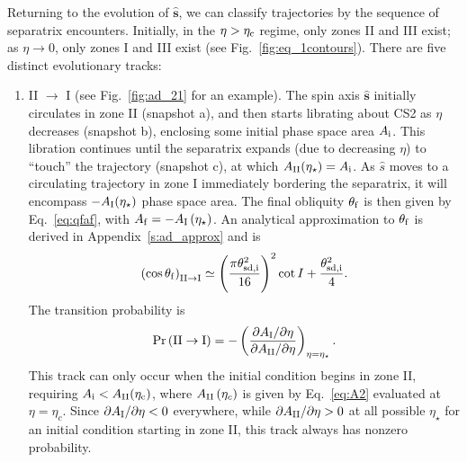 \documentclass[
        fleqn,
        usenatbib,
    ]{mnras}
\newcommand*{\pdil}[2]{\partial#1 / \partial#2}
\newcommand*{\bm}[1]{\boldsymbol{\mathbf{#1}}}
\newcommand*{\uv}[1]{\hat{\bm{#1}}}
\newcommand*{\p}[1]{\left(#1\right)}
\begin{document}
Returning to the evolution of $\uv{s}$, we can classify trajectories by the
sequence of separatrix encounters. Initially, in the $\eta > \eta_{\rm c}$
regime, only zones II and III exist; as $\eta \to 0$, only zones I and III exist
(see Fig.~\ref{fig:eq_1contours}). There are five distinct evolutionary tracks:
\begin{enumerate}
    \item II $\to$ I (see Fig.~\ref{fig:ad_21} for an example). The spin axis
        $\uv{s}$ initially circulates in zone II (snapshot a), and then starts
        librating about CS2 as $\eta$ decreases (snapshot b), enclosing some
        initial phase space area $A_{\rm i}$. This libration continues until the
        separatrix expands (due to decreasing $\eta$) to ``touch'' the
        trajectory (snapshot c), at which $A_{\rm II}(\eta_\star) = A_{\rm i}$.
        As $\hat{s}$ moves to a circulating trajectory in zone I immediately
        bordering the separatrix, it will encompass $-A_{\rm I}(\eta_\star)$
        phase space area. The final obliquity $\theta_{\rm f}$ is then given by
        Eq.~\eqref{eq:qfaf}, with $A_{\rm f} = -A_{\rm I}\p{\eta_\star}$. An
        analytical approximation to $\theta_{\rm f}$ is derived in
        Appendix~\ref{s:ad_approx} and is
        \begin{equation}
            \p{\cos \theta_{\rm f}}_{\rm II \to I} \simeq
                \p{\frac{\pi \theta_{\rm sd, i}^2}{16}}^2 \cot I
                    + \frac{\theta_{\rm sd, i}^2}{4}.\label{eq:qf_21_approx}
        \end{equation}
        The transition probability is
        \begin{equation}
            \Pr\p{\mathrm{II} \to \mathrm{I}} = -\p{
                \frac{\pdil{A_{\rm I}}{\eta}}{\pdil{A_{\rm II}}{\eta}}}
                    _{\eta = \eta_{\star}}.
        \end{equation}
        This track can only occur when the initial condition begins in zone II,
        requiring $A_{\rm i} < A_{\rm II}(\eta_{\rm c})$, where $A_{\rm
        II}\p{\eta_c}$ is given by Eq.~\eqref{eq:A2} evaluated at $\eta =
        \eta_c$. Since $\pdil{A_{\rm I}}{\eta} < 0$ everywhere, while
        $\pdil{A_{\rm II}}{\eta} > 0$ at all possible $\eta_\star$ for an
        initial condition starting in zone II, this track always has nonzero
        probability.


\end{enumerate}
\end{document}
